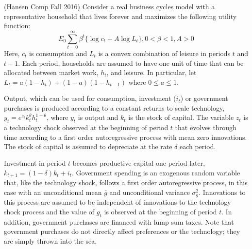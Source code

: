 \documentclass[answers]{exam}
\begin{document}
\begin{questions}
    \question \href{https://economics.ucla.edu/wp-content/uploads/2016/10/macro-f16.pdf}{(Hansen Comp Fall 2016)}
    Consider a real business cycles model with a representative household that lives forever and maximizes the following utility function:
    $$E_0 \sum_{t=0}^{\infty} \beta^t \{ \log{c_t} + A \log{L_t} \}, 0 < \beta < 1, A > 0$$
    Here, $c_t$ is consumption and $L_t$ is a convex combination of leisure in periods $t$ and $t-1$. Each period, households are assumed to have one unit of time that can be allocated between market work, $h_t$, and leisure. In particular, let $L_t = a(1-h_t) + (1-a)(1-h_{t-1})$ where $0 \leq a \leq 1$. 


    Output, which can be used for consumption, investment ($i_t$) or government purchases is produced according to a constant returns to scale technology, $y_t = e^{z_t} k_t^\theta h_t^{1-\theta}$, where $y_t$ is output and $k_t$ is the stock of capital. The variable $z_t$ is a technology shock observed at 
    the beginning of period $t$ that evolves through time according to a first order autoregressive process with mean
    zero innovations. The stock of capital is assumed to depreciate at the rate $\delta$ each period. 


    Investment in period $t$ becomes productive capital one period later, $k_{t+1} = (1-\delta)k_t + i_t$. Government spending is an exogenous random variable that, like the technology shock, follows a first order autoregressive process, in this case with an unconditional mean $\bar{g}$ and unconditional variance $\sigma_g^2$. Innovations to this process are assumed 
    to be independent of innovations to the technology shock process and the value of $g_t$ is observed at the beginning of period $t$. In addition, government purchases are financed with lump sum taxes. Note that government purchases do not directly affect preferences or the technology; they are simply thrown into the sea.
    \begin{parts}

\end{parts}
\end{questions}
\end{document}
